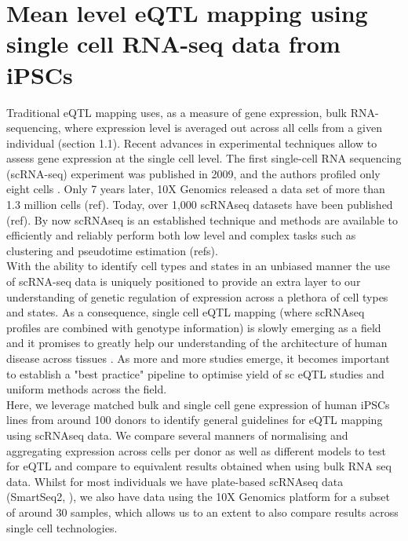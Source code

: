 
\chapter{Mean level eQTL mapping using single cell RNA-seq data from iPSCs}

Traditional eQTL mapping uses, as a measure of gene expression, bulk RNA-sequencing, where expression level is averaged out across all cells from a given individual (section 1.1).
Recent advances in experimental techniques allow to assess gene expression at the single cell level.
The first single-cell RNA sequencing (scRNA-seq) experiment was published in 2009, and the authors profiled only eight cells \cite{tang2009mrna}. 
Only 7 years later, 10X Genomics released a data set of more than 1.3 million cells (ref).
Today, over 1,000 scRNAseq datasets have been published (ref).
By now scRNAseq is an established technique and methods are available to efficiently and reliably perform both low level and complex tasks such as clustering and pseudotime estimation (refs).\\

With the ability to identify cell types and states in an unbiased manner the use of scRNA-seq data is uniquely positioned to provide an extra layer to our understanding of genetic regulation of expression across a plethora of cell types and states.
As a consequence, single cell eQTL mapping (where scRNAseq profiles are combined with genotype information) is slowly emerging as a field and it promises to greatly help our understanding of the architecture of human disease across tissues \cite{van2018single, cuomo2020single, jerber2020population, van2020single}.
As more and more studies emerge, it becomes important to establish a "best practice" pipeline to optimise yield of sc eQTL studies and uniform methods across the field.\\

Here, we leverage matched bulk and single cell gene expression of human iPSCs lines from around 100 donors to identify general guidelines for eQTL mapping using scRNAseq data.
We compare several manners of normalising and aggregating expression across cells per donor as well as different models to test for eQTL and compare to equivalent results obtained when using bulk RNA seq data.
Whilst for most individuals we have plate-based scRNAseq data (SmartSeq2, \cite{picelli2013smart}), we also have data using the 10X Genomics platform \cite{} for a subset of around 30 samples, which allows us to an extent to also compare results across single cell technologies.

